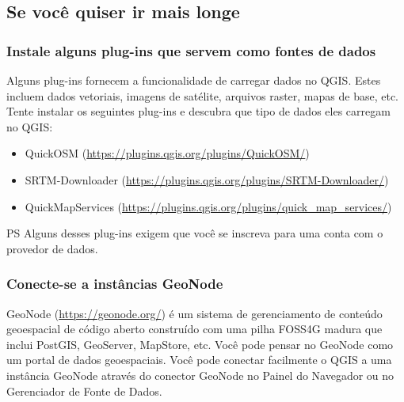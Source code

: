 \documentclass[
]{krantz}
\providecommand{\tightlist}{%
  \setlength{\itemsep}{0pt}\setlength{\parskip}{0pt}}
\begin{document}
\hypertarget{se-vocuxea-quiser-ir-mais-longe-2}{%
\subsection{Se você quiser ir mais longe}\label{se-vocuxea-quiser-ir-mais-longe-2}}

\hypertarget{instale-alguns-plug-ins-que-servem-como-fontes-de-dados}{%
\subsubsection{\texorpdfstring{\textbf{Instale alguns plug-ins que servem como fontes de dados}}{Instale alguns plug-ins que servem como fontes de dados}}\label{instale-alguns-plug-ins-que-servem-como-fontes-de-dados}}

Alguns plug-ins fornecem a funcionalidade de carregar dados no QGIS. Estes incluem dados vetoriais, imagens de satélite, arquivos raster, mapas de base, etc. Tente instalar os seguintes plug-ins e descubra que tipo de dados eles carregam no QGIS:

\begin{itemize}
\tightlist
\item
  QuickOSM (\url{https://plugins.qgis.org/plugins/QuickOSM/})
\item
  SRTM-Downloader (\url{https://plugins.qgis.org/plugins/SRTM-Downloader/})
\item
  QuickMapServices (\url{https://plugins.qgis.org/plugins/quick_map_services/})
\end{itemize}

PS Alguns desses plug-ins exigem que você se inscreva para uma conta com o provedor de dados.

\hypertarget{conecte-se-a-instuxe2ncias-geonode}{%
\subsubsection{\texorpdfstring{\textbf{Conecte-se a instâncias GeoNode}}{Conecte-se a instâncias GeoNode}}\label{conecte-se-a-instuxe2ncias-geonode}}

GeoNode (\url{https://geonode.org/}) é um sistema de gerenciamento de conteúdo geoespacial de código aberto construído com uma pilha FOSS4G madura que inclui PostGIS, GeoServer, MapStore, etc. Você pode pensar no GeoNode como um portal de dados geoespaciais. Você pode conectar facilmente o QGIS a uma instância GeoNode através do conector GeoNode no Painel do Navegador ou no Gerenciador de Fonte de Dados.
\end{document}
